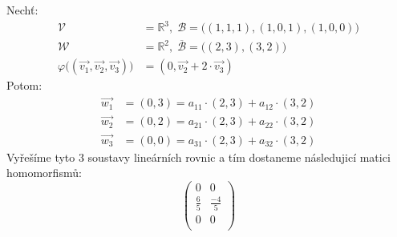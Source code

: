 \begin{example}
    Nechť:
    \begin{align*}
        \mathcal{V} &= \mathbb{R}^3,\;\mathcal{B} = \big((1,1,1), (1,0,1), (1,0,0) \big)\\
        \mathcal{W} &= \mathbb{R}^2,\;\overline{\mathcal{B}} = \big((2,3), (3,2) \big)\\
        \varphi \big((\vec{v_1}, \vec{v_2}, \vec{v_3})\big) &= (0, \vec{v_2} + 2\cdot \vec{v_3})
    \end{align*}
    Potom:
    \begin{align*}
        \vec{w_1} &= (0, 3) = a_{11} \cdot (2, 3) + a_{12}\cdot (3,2)\\
        \vec{w_2} &= (0, 2) = a_{21} \cdot (2, 3) + a_{22}\cdot (3,2)\\
        \vec{w_3} &= (0, 0) = a_{31} \cdot (2, 3) + a_{32}\cdot (3,2)
    \end{align*}
    Vyřešíme tyto 3 soustavy lineárních rovnic a tím dostaneme následujicí matici homomorfismů:
    $$\begin{pmatrix}
       0 & 0\\
       \frac{6}{5} & \frac{-4}{5}\\
       0 & 0\\
    \end{pmatrix}$$
\end{example}